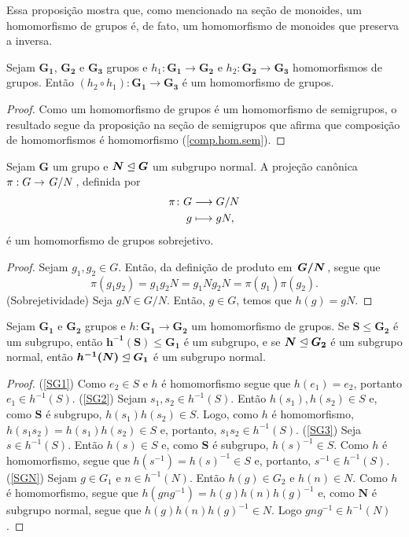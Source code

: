 	Essa proposição mostra que, como mencionado na seção de monoides, um homomorfismo de grupos é, de fato, um homomorfismo de monoides que preserva a inversa.

\begin{proposition}
\label{comp.hom.gru}
Sejam $\bm{G_1}$, $\bm{G_2}$ e $\bm{G_3}$ grupos e $h_1: \bm{G_1} \to \bm{G_2}$ e $h_2: \bm{G_2} \to \bm{G_3}$ homomorfismos de grupos. Então $(h_2 \circ h_1): \bm{G_1} \to \bm{G_3}$ é um homomorfismo de grupos.
\end{proposition}
\begin{proof}
Como um homomorfismo de grupos é um homomorfismo de semigrupos, o resultado segue da proposição na seção de semigrupos que afirma que composição de homomorfismos é homomorfismo (\ref{comp.hom.sem}).
\end{proof}

\begin{proposition}
Sejam $\bm G$ um grupo e $\bm N \mathrel{\unlhd} \bm G$ um subgrupo normal. A projeção canônica $\pi: G \to \quo{G}{N}$, definida por
	\begin{align*}
	{\pi}\colon {G} &\longrightarrow {G/N} \\{g} &\longmapsto gN,
	\end{align*}
é um homomorfismo de grupos sobrejetivo.
\end{proposition}
\begin{proof}
Sejam $g_1,g_2 \in G$. Então, da definição de produto em $\bm{\quo{G}{N}}$, segue que
	\begin{equation*}
	\pi(g_1g_2) = g_1g_2N = g_1Ng_2N = \pi(g_1)\pi(g_2).
	\end{equation*}
(Sobrejetividade) Seja $gN \in G/N$. Então, $g \in G$, temos que $h(g)=gN$.
\end{proof}

\begin{proposition}
\label{alge:prop.gru.hominv}
Sejam $\bm{G_1}$ e $\bm{G_2}$ grupos e $h: \bm{G_1} \to \bm{G_2}$ um homomorfismo de grupos. Se $\bm S \leq \bm{G_2}$ é um subgrupo, então $\bm{h^{-1}(S)} \leq \bm{G_1}$ é um subgrupo, e se $\bm N \mathrel{\unlhd} \bm{G_2}$ é um subgrupo normal, então $\bm{h^{-1}(N)} \mathrel{\unlhd} \bm{G_1}$ é um subgrupo normal.
\end{proposition}
\begin{proof}
(\ref{SG1}) Como $e_2 \in S$ e $h$ é homomorfismo segue que $h(e_1)=e_2$, portanto $e_1 \in h^{-1}(S)$.
(\ref{SG2}) Sejam $s_1,s_2 \in h^{-1}(S)$. Então $h(s_1),h(s_2) \in S$ e, como $\bm S$ é subgrupo, $h(s_1)h(s_2) \in S$. Logo, como $h$ é homomorfismo, $h(s_1s_2) = h(s_1)h(s_2) \in S$ e, portanto, $s_1s_2 \in h^{-1}(S)$.
(\ref{SG3}) Seja $s \in h^{-1}(S)$. Então $h(s) \in S$ e, como $\bm S$ é subgrupo, $h(s)^{-1} \in S$. Como $h$ é homomorfismo, segue que $h(s^{-1})=h(s)^{-1} \in S$ e, portanto, $s^{-1} \in h^{-1}(S)$.  
(\ref{SGN}) Sejam $g \in G_1$ e $n \in h^{-1}(N)$. Então $h(g) \in G_2$ e $h(n) \in N$. Como $h$ é homomorfismo, segue que $h(gng^{-1})=h(g)h(n)h(g)^{-1}$ e, como $\bm N$ é subgrupo normal, segue que $h(g)h(n)h(g)^{-1} \in N$. Logo $gng^{-1} \in h^{-1}(N)$.
\end{proof}


